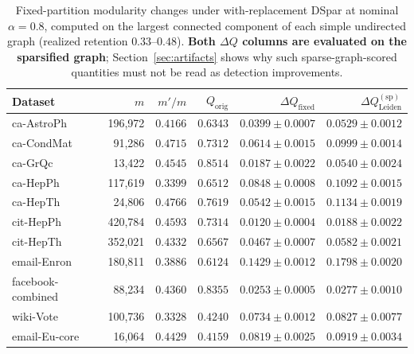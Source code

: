 \begin{table}[t]
\centering
\caption{Fixed-partition modularity changes under with-replacement DSpar at nominal $\alpha = 0.8$, computed on the largest connected component of each simple undirected graph (realized retention $0.33$--$0.48$).
\textbf{Both $\Delta Q$ columns are evaluated on the sparsified graph}; Section~\ref{sec:artifacts} shows why such sparse-graph-scored quantities must not be read as detection improvements.}
\label{tab:exp1_2_modularity}
\begin{tabular}{lrrrrr}
\toprule
Dataset & $m$ & $m'/m$ & $Q_{\mathrm{orig}}$ & $\Delta Q_{\mathrm{fixed}}$ & $\Delta Q_{\mathrm{Leiden}}^{\mathrm{(sp)}}$ \\
\midrule
ca-AstroPh\cite{leskovec2007graph} & 196,972 & $0.4166$ & $0.6343$ & $0.0399 \pm 0.0007$ & $0.0529 \pm 0.0012$ \\
ca-CondMat\cite{leskovec2007graph} & 91,286 & $0.4715$ & $0.7312$ & $0.0614 \pm 0.0015$ & $0.0999 \pm 0.0014$ \\
ca-GrQc\cite{leskovec2007graph} & 13,422 & $0.4545$ & $0.8514$ & $0.0187 \pm 0.0022$ & $0.0540 \pm 0.0024$ \\
ca-HepPh\cite{leskovec2007graph} & 117,619 & $0.3399$ & $0.6512$ & $0.0848 \pm 0.0008$ & $0.1092 \pm 0.0015$ \\
ca-HepTh\cite{leskovec2007graph} & 24,806 & $0.4766$ & $0.7619$ & $0.0542 \pm 0.0015$ & $0.1134 \pm 0.0019$ \\
cit-HepPh\cite{leskovec2007graph} & 420,784 & $0.4593$ & $0.7314$ & $0.0120 \pm 0.0004$ & $0.0188 \pm 0.0022$ \\
cit-HepTh\cite{leskovec2007graph} & 352,021 & $0.4332$ & $0.6567$ & $0.0467 \pm 0.0007$ & $0.0582 \pm 0.0021$ \\
email-Enron\cite{leskovec2009community} & 180,811 & $0.3886$ & $0.6124$ & $0.1429 \pm 0.0012$ & $0.1798 \pm 0.0020$ \\
facebook-combined\cite{leskovec2012learning} & 88,234 & $0.4360$ & $0.8355$ & $0.0253 \pm 0.0005$ & $0.0277 \pm 0.0010$ \\
wiki-Vote\cite{leskovec2010signed} & 100,736 & $0.3328$ & $0.4240$ & $0.0734 \pm 0.0012$ & $0.0827 \pm 0.0077$ \\
email-Eu-core\cite{yin2017local} & 16,064 & $0.4429$ & $0.4159$ & $0.0819 \pm 0.0025$ & $0.0919 \pm 0.0034$ \\
\bottomrule
\end{tabular}
\end{table}
